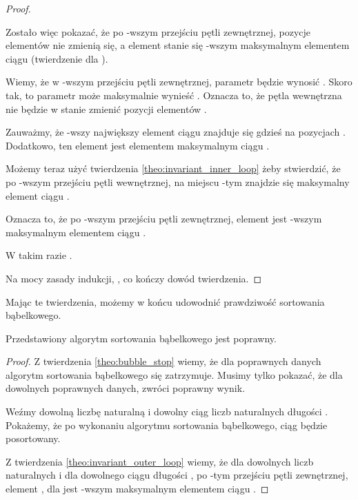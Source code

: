\begin{example}
\begin{proof}
\begin{itemize}
    Zostało więc pokazać, że po -wszym przejściu pętli zewnętrznej, pozycje elementów  nie zmienią się, a element  stanie się -wszym maksymalnym elementem ciągu  (twierdzenie dla ).
    
    Wiemy, że w -wszym przejściu pętli zewnętrznej, parametr  będzie wynosić . Skoro tak, to parametr  może maksymalnie wynieść . Oznacza to, że pętla wewnętrzna nie będzie w stanie zmienić pozycji elementów .
    
    Zauważmy, że -wszy największy element ciągu  znajduje się gdzieś na pozycjach . Dodatkowo, ten element jest elementem maksymalnym ciągu .
    
    Możemy teraz użyć twierdzenia \ref{theo:invariant_inner_loop} żeby stwierdzić, że po -wszym przejściu pętli wewnętrznej, na miejscu -tym znajdzie się maksymalny element ciągu .
    
    Oznacza to, że po -wszym przejściu pętli zewnętrznej, element  jest -wszym maksymalnym elementem ciągu .
    
   W takim razie .
\end{itemize}

Na mocy zasady indukcji, , co kończy dowód twierdzenia.
\end{proof}

Mając te twierdzenia, możemy w końcu udowodnić prawdziwość sortowania bąbelkowego.

\begin{theo}
Przedstawiony algorytm sortowania bąbelkowego jest poprawny.
\end{theo}

\begin{proof}
Z twierdzenia \ref{theo:bubble_stop} wiemy, że dla poprawnych danych algorytm sortowania bąbelkowego się zatrzymuje. Musimy tylko pokazać, że dla dowolnych poprawnych danych, zwróci poprawny wynik.

Weźmy dowolną liczbę naturalną  i dowolny ciąg liczb naturalnych  długości . Pokażemy, że po wykonaniu algorytmu sortowania bąbelkowego, ciąg  będzie posortowany.

Z twierdzenia \ref{theo:invariant_outer_loop} wiemy, że dla dowolnych liczb naturalnych  i dla dowolnego ciągu  długości , po -tym przejściu pętli zewnętrznej, element , dla  jest -wszym maksymalnym elementem ciągu .


\end{proof}
\end{example}
